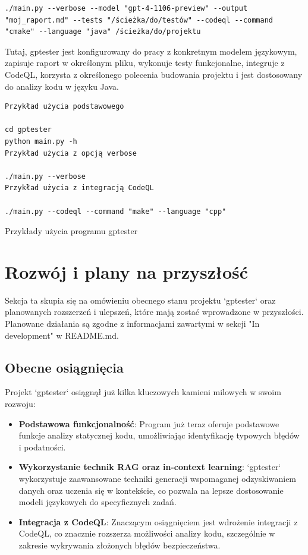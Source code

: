 \begin{verbatim}
./main.py --verbose --model "gpt-4-1106-preview" --output "moj_raport.md" --tests "/ścieżka/do/testów" --codeql --command "cmake" --language "java" /ścieżka/do/projektu
\end{verbatim}

Tutaj, gptester jest konfigurowany do pracy z konkretnym modelem językowym, zapisuje raport w określonym pliku, wykonuje testy funkcjonalne, integruje z CodeQL, korzysta z określonego polecenia budowania projektu i jest dostosowany do analizy kodu w języku Java.
\begin{listing}
    \begin{verbatim}  
Przykład użycia podstawowego

cd gptester
python main.py -h
Przykład użycia z opcją verbose

./main.py --verbose
Przykład użycia z integracją CodeQL

./main.py --codeql --command "make" --language "cpp"
    \end{verbatim}
    \caption{Przykłady użycia programu gptester}
    \label{lst:przyklady_uzycia}
\end{listing}

\section{Rozwój i plany na przyszłość}
\label{sec:rozwoj_i_plany_na_przyszlosc}

Sekcja ta skupia się na omówieniu obecnego stanu projektu `gptester` oraz planowanych rozszerzeń i ulepszeń, które mają zostać wprowadzone w przyszłości. Planowane działania są zgodne z informacjami zawartymi w sekcji "In development" w README.md.

\subsection{Obecne osiągnięcia}
\label{subsec:obecne_osiagniecia}

Projekt `gptester` osiągnął już kilka kluczowych kamieni milowych w swoim rozwoju:

\begin{itemize}
    \item \textbf{Podstawowa funkcjonalność}: Program już teraz oferuje podstawowe funkcje analizy statycznej kodu, umożliwiając identyfikację typowych błędów i podatności.
    \item \textbf{Wykorzystanie technik RAG oraz in-context learning}: `gptester` wykorzystuje zaawansowane techniki generacji wspomaganej odzyskiwaniem danych oraz uczenia się w kontekście, co pozwala na lepsze dostosowanie modeli językowych do specyficznych zadań.
    \item \textbf{Integracja z CodeQL}: Znaczącym osiągnięciem jest wdrożenie integracji z CodeQL, co znacznie rozszerza możliwości analizy kodu, szczególnie w zakresie wykrywania złożonych błędów bezpieczeństwa.
\end{itemize}

